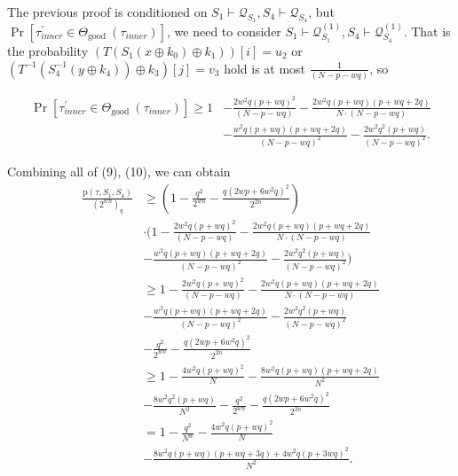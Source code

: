%












The previous proof is conditioned on $S_{1} \vdash \mathcal{Q}_{S_{1}}, S_{4} \vdash \mathcal{Q}_{S_{4}}$, but $\operatorname{Pr}\left[ \tau_{inner}^{\prime} \in \Theta_{\text {good }}(\tau_{inner})\right]$, we need to consider $S_{1} \vdash \mathcal{Q}_{S_{1}}^{(1)}, S_{4} \vdash \mathcal{Q}_{S_{4}}^{(1)}$. That is the probability $\left(T\left(S_{1}\left(x \oplus k_{0}\right) \oplus k_{1}\right)\right)[i]=u_2$ or $\left(T^{-1}\left(S_{4}^{-1}\left(y \oplus k_{4}\right)\right) \oplus k_{3}\right)[j]=v_3$ hold is at most $\frac{1}{(N-p-w q)}$, so

\begin{equation}
\begin{aligned}
\operatorname{Pr}\left[ \tau_{inner}^{\prime} \in \Theta_{\text {good }}(\tau_{inner})\right] \geq 1&- \frac{2 w^{2} q (p+w q)^{2}}{(N-p-w q)} -\frac{2 w^{2} q (p+w q)(p+w q+2 q)}{N \cdot (N-p-w q)}\\
&- \frac{w^{2} q (p+w q)(p+w q+2 q)}{(N-p-w q)^2} - \frac{2 w^{2} q^{2} (p+w q)}{(N- p- wq)^2}.
\end{aligned}
\end{equation}




Combining all of (9), (10), we can obtain
$$
\begin{aligned}
\frac{\mathrm{p}\left(\tau, S_{1}, S_{4}\right)}{\left(2^{w n}\right)_{q}} &\geq (1-\frac{q^{2}}{2^{w n}}-\frac{q\left(2 w p+6 w^{2} q\right)^{2}}{2^{2 n}})\\
&\cdot (1- \frac{2 w^{2} q (p+w q)^{2}}{(N-p-w q)} -\frac{2 w^{2} q (p+w q)(p+w q+2 q)}{N \cdot (N-p-w q)}\\
&- \frac{w^{2} q (p+w q)(p+w q+2 q)}{(N-p-w q)^2} - \frac{2 w^{2} q^{2} (p+w q)}{(N- p- wq)^2})\\
&\geq 1- \frac{2 w^{2} q (p+w q)^{2}}{(N-p-w q)} -\frac{2 w^{2} q (p+w q)(p+w q+2 q)}{N \cdot (N-p-w q)}\\
&- \frac{w^{2} q (p+w q)(p+w q+2 q)}{(N-p-w q)^2} - \frac{2 w^{2} q^{2} (p+w q)}{(N- p- wq)^2}\\
& -\frac{q^{2}}{2^{w n}}-\frac{q\left(2 w p+6 w^{2} q\right)^{2}}{2^{2 n}}\\
&\geq 1- \frac{4 w^2 q(p+wq)^2}{N} - \frac{8 w^2 q(p+w q)(p+w q +2 q)}{N^2}\\
&- \frac{8 w^2 q^2(p+w q)}{N^2} - \frac{q^{2}}{2^{w n}}-\frac{q\left(2 w p+6 w^{2} q\right)^{2}}{2^{2 n}}\\
&= 1 - \frac{q^2}{N^w} - \frac{4 w^2 q(p+wq)^2}{N}\\
&- \frac{8 w^2 q(p+w q)(p+w q +3 q)+4 w^2 q(p+3 wq)^2}{N^2}.
\end{aligned}
$$

